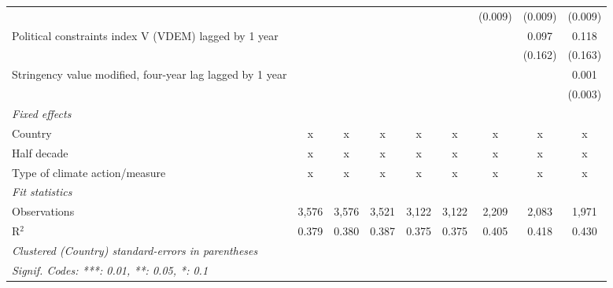 \begin{tabular}{lcccccccc}
                                                                            &             &             &             &             &             & (0.009)      & (0.009)      & (0.009)\\   
   Political constraints index V (VDEM) lagged by 1 year                    &             &             &             &             &             &              & 0.097        & 0.118\\   
                                                                            &             &             &             &             &             &              & (0.162)      & (0.163)\\   
   Stringency value modified, four-year lag lagged by 1 year                &             &             &             &             &             &              &              & 0.001\\   
                                                                            &             &             &             &             &             &              &              & (0.003)\\   
   \emph{Fixed effects}\\
   Country                                                                  & x           & x           & x           & x           & x           & x            & x            & x\\  
   Half decade                                                              & x           & x           & x           & x           & x           & x            & x            & x\\  
   Type of climate action/measure                                           & x           & x           & x           & x           & x           & x            & x            & x\\  
   \midrule \emph{Fit statistics}\\
   Observations                                                             & 3,576       & 3,576       & 3,521       & 3,122       & 3,122       & 2,209        & 2,083        & 1,971\\  
   R$^2$                                                                    & 0.379       & 0.380       & 0.387       & 0.375       & 0.375       & 0.405        & 0.418        & 0.430\\  
   \midrule
   \multicolumn{9}{l}{\emph{Clustered (Country) standard-errors in parentheses}}\\
   \multicolumn{9}{l}{\emph{Signif. Codes: ***: 0.01, **: 0.05, *: 0.1}}\\
\end{tabular}
\par\endgroup


